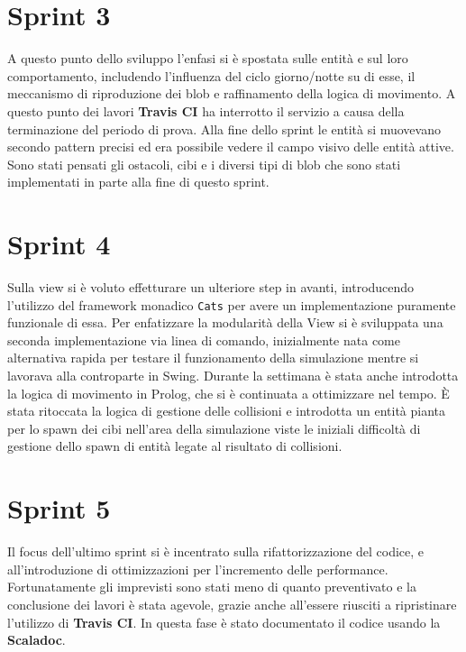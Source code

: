 \section{Sprint 3}
A questo punto dello sviluppo l'enfasi si è spostata sulle entità e sul loro comportamento, includendo l'influenza del ciclo giorno/notte su di esse, il meccanismo di riproduzione dei blob e raffinamento della logica di movimento. A questo punto dei lavori \textbf{Travis CI} ha interrotto il servizio a causa della terminazione del periodo di prova.  Alla fine dello sprint le entità si muovevano secondo pattern precisi ed era possibile vedere il campo visivo delle entità attive. Sono stati pensati gli ostacoli, cibi e i diversi tipi di blob che sono stati implementati in parte alla fine di questo sprint.

\section{Sprint 4}
Sulla view si è voluto effetturare un ulteriore step in avanti, introducendo l'utilizzo del framework monadico \texttt{Cats} per avere un implementazione puramente funzionale di essa. Per enfatizzare la modularità della View si è sviluppata una seconda implementazione via linea di comando, inizialmente nata come alternativa rapida per testare il funzionamento della simulazione mentre si lavorava alla controparte in Swing. Durante la settimana è stata anche introdotta la logica di movimento in Prolog, che si è continuata a ottimizzare nel tempo. È stata ritoccata la logica di gestione delle collisioni e introdotta un entità pianta per lo spawn dei cibi nell'area della simulazione viste le iniziali difficoltà di gestione dello spawn di entità legate al risultato di collisioni.

\section{Sprint 5}
Il focus dell'ultimo sprint si è incentrato sulla rifattorizzazione del codice, e all'introduzione di ottimizzazioni per l'incremento delle performance. Fortunatamente gli imprevisti sono stati meno di quanto preventivato e la conclusione dei lavori è stata agevole, grazie anche all'essere riusciti a ripristinare l'utilizzo di \textbf{Travis CI}. In questa fase è stato documentato il codice usando la \textbf{Scaladoc}.